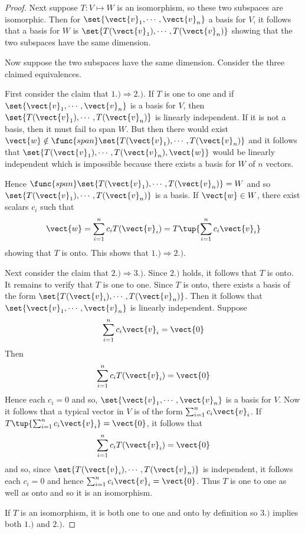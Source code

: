 \begin{proof}
Next suppose $T:V \mapsto W$ is an isomorphism, so these two subspaces are isomorphic. Then for $\set{\vect{v}_{1},\cdots ,\vect{v}_{n}} $ a
basis for $V$, it follows that a basis for $W$
is $\set{T(\vect{v}_{1}),\cdots ,T(\vect{v}_{n})} $ showing that the two
subspaces have the same dimension.

Now suppose the two subspaces have the same dimension. Consider the three
claimed equivalences.

First consider the claim that $1.)\Rightarrow 2.)$. If $T$ is one to one and if $\set{\vect{v}_{1},\cdots ,\vect{v}
_{n}} $ is a basis for $V$, then $\set{T(\vect{v}_{1}),\cdots ,T(\vect{v
}_{n})} $ is linearly independent. If it is not a basis, then it must
fail to span $W$. But then there would exist $\vect{w}\notin \func{span}
\set{T(\vect{v}_{1}),\cdots ,T(\vect{v}_{n})} $ and it follows that $\set{T(\vect{v}_{1}),\cdots ,T(\vect{v}_{n}),\vect{w}
} $ would be linearly independent which is impossible because there exists a basis for $W$ of $n$ vectors.

Hence $\func{span}\set{T(\vect{v}_{1}),\cdots ,T(\vect{v}_{n})} =W$ and
so $\set{T(\vect{v}_{1}),\cdots ,T(\vect{v}_{n})} $ is a basis. If $\vect{w}\in W$, there exist scalars $c_{i}$ such that 
\begin{equation*}
\vect{w}=\sum_{i=1}^{n}c_{i}T(\vect{v}_{i})=T\tup{\sum_{i=1}^{n}c_{i}\vect{v}
_{i}}
\end{equation*}
showing that $T$ is onto. This shows that $1.)\Rightarrow 2.)$.

Next consider the claim that $2.)\Rightarrow 3.)$. Since $2.)$ holds, it
follows that $T$ is onto. It remains to verify that $T$ is one to one. Since 
$T$ is onto, there exists a basis of the form $\set{T(\vect{v}_{i}),\cdots ,T(\vect{v}_{n})}$. Then it follows that $\set{\vect{v}_{1},\cdots ,
\vect{v}_{n}} $ is linearly independent. Suppose 
\begin{equation*}
\sum_{i=1}^{n}c_{i}\vect{v}_{i}=\vect{0}
\end{equation*}
Then 
\begin{equation*}
\sum_{i=1}^{n}c_{i}T(\vect{v}_{i})=\vect{0}
\end{equation*}
Hence each $c_{i}=0$ and so, $\set{\vect{v}_{1},\cdots ,\vect{v}
_{n}} $ is a basis for $V$. Now it follows that a typical vector in $
V $ is of the form $\sum_{i=1}^{n}c_{i}\vect{v}_{i}$. If $T\tup{
\sum_{i=1}^{n}c_{i}\vect{v}_{i}} =\vect{0}$, it follows that 
\begin{equation*}
\sum_{i=1}^{n}c_{i}T(\vect{v}_{i})=\vect{0}
\end{equation*}
and so, since $\set{T(\vect{v}_{i}),\cdots ,T(\vect{v}_{n})} $ is
independent, it follows each $c_{i}=0$ and hence $\sum_{i=1}^{n}c_{i}\vect{v}
_{i}=\vect{0}$. Thus $T$ is one to one as well as onto and so it is an
isomorphism.

If $T$ is an isomorphism, it is both one to one and onto by definition so $
3.)$ implies both $1.)$ and $2.)$.
\end{proof}

